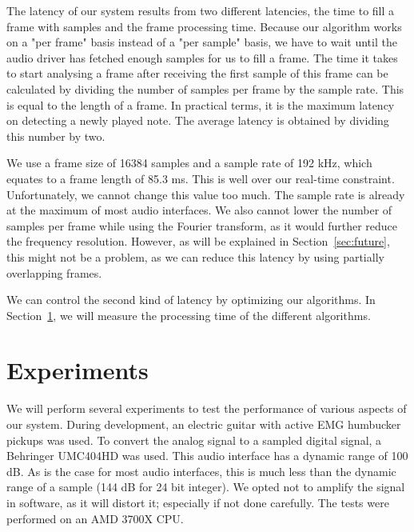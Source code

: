 \documentclass[10pt,twocolumn]{article}
\begin{document}
The latency of our system results from two different latencies, the time to fill a frame with samples and the frame processing time. Because our algorithm works on a "per frame" basis instead of a "per sample" basis, we have to wait until the audio driver has fetched enough samples for us to fill a frame. The time it takes to start analysing a frame after receiving the first sample of this frame can be calculated by dividing the number of samples per frame by the sample rate. This is equal to the length of a frame. In practical terms, it is the maximum latency on detecting a newly played note. The average latency is obtained by dividing this number by two.

We use a frame size of 16384 samples and a sample rate of 192 kHz, which equates to a frame length of 85.3 ms. This is well over our real-time constraint. Unfortunately, we cannot change this value too much. The sample rate is already at the maximum of most audio interfaces. We also cannot lower the number of samples per frame while using the Fourier transform, as it would further reduce the frequency resolution. However, as will be explained in Section~\ref{sec:future}, this might not be a problem, as we can reduce this latency by using partially overlapping frames.

We can control the second kind of latency by optimizing our algorithms. In Section~\ref{sec:exp}, we will measure the processing time of the different algorithms.


\section{Experiments}  \label{sec:exp}
We will perform several experiments to test the performance of various aspects of our system. During development, an electric guitar with active EMG humbucker pickups was used. To convert the analog signal to a sampled digital signal, a Behringer UMC404HD was used. This audio interface has a dynamic range of 100 dB. As is the case for most audio interfaces, this is much less than the dynamic range of a sample (144 dB for 24 bit integer). We opted not to amplify the signal in software, as it will distort it; especially if not done carefully. The tests were performed on an AMD 3700X CPU.
%
\end{document}
